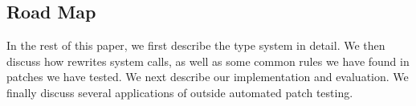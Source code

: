 \subsection{Road Map}
In the rest of this paper, we first describe the \tachyon type system in detail. We
then discuss how \tachyon rewrites system calls, as well as some
common rules we have found in patches we have tested. We next describe
our implementation and evaluation. We finally discuss several
applications of \tachyon outside automated patch testing.


